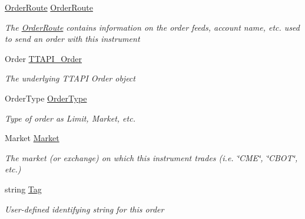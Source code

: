 \begin{DoxyCompactItemize}
\hyperlink{class_e_z_a_p_i_1_1_containers_1_1_order_route}{Order\-Route} \hyperlink{class_e_z_a_p_i_1_1_containers_1_1_t_t_order_a5bde3e366d744617cc72e2502bc2a82a}{Order\-Route}
\begin{DoxyCompactList}\small\item\em The \hyperlink{class_e_z_a_p_i_1_1_containers_1_1_order_route}{Order\-Route} contains information on the order feeds, account name, etc. used to send an order with this instrument \end{DoxyCompactList}\item 
Order \hyperlink{class_e_z_a_p_i_1_1_containers_1_1_t_t_order_a609ce2ae0f91344af295767e1719b822}{T\-T\-A\-P\-I\-\_\-\-Order}
\begin{DoxyCompactList}\small\item\em The underlying T\-T\-A\-P\-I Order object \end{DoxyCompactList}\item 
Order\-Type \hyperlink{class_e_z_a_p_i_1_1_containers_1_1_t_t_order_a20a9af1c0910044beea2eb31d6d633fa}{Order\-Type}
\begin{DoxyCompactList}\small\item\em Type of order as Limit, Market, etc. \end{DoxyCompactList}\item 
Market \hyperlink{class_e_z_a_p_i_1_1_containers_1_1_t_t_order_a5490863423d4aa1d048b4a52ff706338}{Market}
\begin{DoxyCompactList}\small\item\em The market (or exchange) on which this instrument trades (i.\-e. \char`\"{}\-C\-M\-E\char`\"{}, \char`\"{}\-C\-B\-O\-T\char`\"{}, etc.) \end{DoxyCompactList}\item 
string \hyperlink{class_e_z_a_p_i_1_1_containers_1_1_t_t_order_ad4d05ca4464eddb49824743cae497e69}{Tag}
\begin{DoxyCompactList}\small\item\em User-\/defined identifying string for this order \end{DoxyCompactList}\item 

\end{DoxyCompactItemize}
